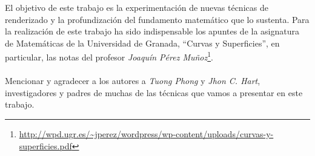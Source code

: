 El objetivo de este trabajo es la experimentación de nuevas técnicas de renderizado y la profundización del fundamento matemático que lo sustenta. Para la realización de este trabajo ha sido indispensable los apuntes de la asignatura de Matemáticas de la Universidad de Granada, \enquote{Curvas y Superficies}, en particular, las notas del profesor \textit{Joaquín Pérez Muñoz}\footnote{\url{http://wpd.ugr.es/~jperez/wordpress/wp-content/uploads/curvas-y-superficies.pdf}}.\\\\
Mencionar y agradecer a los autores a \textit{Tuong Phong} y \textit{Jhon C. Hart}, investigadores y padres de muchas de las técnicas que vamos a presentar en este trabajo.